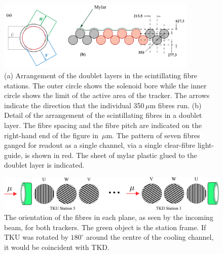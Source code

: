   \begin{figure}[tbh]
    \begin{center}
      \includegraphics[width=0.85\textwidth]{01-MICE/doublet-layer.pdf}
      \caption{\label{fig:DoubletLayer}(a) Arrangement of the doublet layers in the scintillating fibre  stations. The outer circle shows the solenoid bore while the inner circle shows the limit of the active area of the tracker. The arrows indicate the direction that the individual 350\,$\mu$m fibres run. (b) Detail of the arrangement of the scintillating fibres in a doublet layer. The fibre spacing and the fibre pitch are indicated on the right-hand end of the figure in \,$\mu$m. The pattern of seven fibres ganged for readout as a single channel, via a single clear-fibre light-guide, is shown in red. The sheet of mylar plastic glued to the doublet layer is indicated. }
    \end{center}
  \end{figure}

  \begin{figure}[tbh]
    \centering
    \includegraphics[width=0.95\linewidth]{01-MICE/FibrePlaneOrientation.pdf} \hspace{2pc}%
    \caption{\label{fig:FibrePlaneOrientation} The orientation of the fibres in each plane, as seen by the incoming beam, for both trackers. The green object is the station frame. If TKU was rotated by $180^\circ$ around the centre of the cooling channel, it would be coincident with TKD.}
  \end{figure}